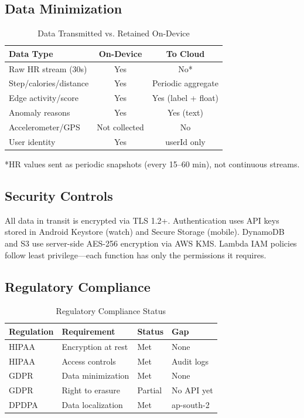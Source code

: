 \documentclass[conference]{IEEEtran}
\begin{document}
\subsection{Data Minimization}

\begin{table}[H]
\centering
\caption{Data Transmitted vs. Retained On-Device}
\label{tab:data_min}
\begin{tabular}{lcc}
\toprule
\textbf{Data Type} & \textbf{On-Device} & \textbf{To Cloud} \\
\midrule
Raw HR stream (30s) & Yes & No* \\
Step/calories/distance & Yes & Periodic aggregate \\
Edge activity/score & Yes & Yes (label + float) \\
Anomaly reasons & Yes & Yes (text) \\
Accelerometer/GPS & Not collected & No \\
User identity & Yes & userId only \\
\bottomrule
\end{tabular}
\end{table}
*HR values sent as periodic snapshots (every 15--60 min), not continuous streams.

\subsection{Security Controls}
All data in transit is encrypted via TLS 1.2+. Authentication uses API keys stored in Android Keystore (watch) and Secure Storage (mobile). DynamoDB and S3 use server-side AES-256 encryption via AWS KMS. Lambda IAM policies follow least privilege---each function has only the permissions it requires.

\subsection{Regulatory Compliance}

\begin{table}[H]
\centering
\caption{Regulatory Compliance Status}
\label{tab:compliance}
\begin{tabular}{p{1.5cm}p{2cm}p{1.2cm}p{2cm}}
\toprule
\textbf{Regulation} & \textbf{Requirement} & \textbf{Status} & \textbf{Gap} \\
\midrule
HIPAA & Encryption at rest & Met & None \\
HIPAA & Access controls & Met & Audit logs \\
GDPR & Data minimization & Met & None \\
GDPR & Right to erasure & Partial & No API yet \\
DPDPA & Data localization & Met & ap-south-2 \\
\bottomrule
\end{tabular}
\end{table}
\end{document}
